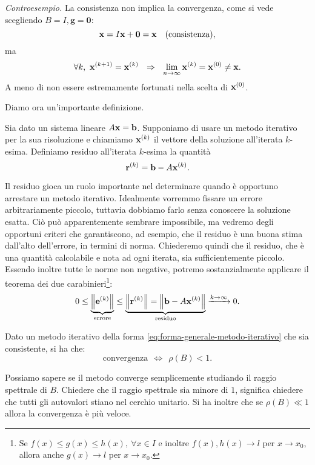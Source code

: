\textit{Controesempio.} La consistenza non implica la convergenza, come si vede scegliendo $B=I,\mathbf{g} =\mathbf{0}$:
\begin{equation*}
 \mathbf{x} =I\mathbf{x} +\mathbf{0} =\mathbf{x} \quad\text{(consistenza)},
\end{equation*}
ma
$$ \mathbf{\forall } k,\ \x^{( k+1)} =\x^{(k)} \ \ \Rightarrow \ \ \lim _{n\rightarrow \infty }\x^{(k)} = \x^{(0)} \neq \x. $$
A meno di non essere estremamente fortunati nella scelta di $\mathbf{x}^{(0)}$. \qedhere

Diamo ora un'importante definizione.
\begin{definition}
	[Residuo]
  Sia dato un sistema lineare $A\mathbf{x}=\mathbf{b}$. Supponiamo di usare un metodo iterativo per la sua risoluzione e chiamiamo $\mathbf{x}^{(k)}$ il vettore della soluzione all'iterata $k$-esima. Definiamo residuo all'iterata $k$-esima la quantità
	\begin{equation}
		 \mathbf{r}^{(k)} =\mathbf{b} -A\mathbf{x}^{(k)}.
	\end{equation}
\end{definition}
Il residuo gioca un ruolo importante nel determinare quando è opportuno arrestare un metodo iterativo.
Idealmente vorremmo fissare un errore arbitrariamente piccolo, tuttavia dobbiamo farlo senza conoscere la soluzione esatta.
Ciò può apparentemente sembrare impossibile, ma vedremo degli opportuni criteri che garantiscono, ad esempio, che il residuo è una buona stima dall'alto dell'errore, in termini di norma. Chiederemo quindi che il residuo, che è una quantità calcolabile e nota ad ogni iterata, sia sufficientemente piccolo. Essendo inoltre tutte le norme non negative, potremo sostanzialmente applicare il teorema dei due carabinieri\footnote{Se $f(x)\le g(x)\le h(x),\ \forall x\in I$ e inoltre $f(x),h(x)\to l$ per $x\to x_{0} $, allora anche $g(x)\to l$ per $x\to x_{0}$.}:
\begin{equation*}
0\leq \underbrace{\left\Vert \mathbf{e}^{(k)}\right\Vert }_{\text{errore}} \leq \underbrace{\left\Vert \mathbf{r}^{(k)}\right\Vert =\left\Vert\mathbf{b} -A\mathbf{x}^{(k)}\right\Vert}_{\text{residuo}}\xrightarrow{k\rightarrow \infty } 0.
\end{equation*}
\begin{theorem}
Dato un metodo iterativo della forma \eqref{eq:forma-generale-metodo-iterativo} che sia consistente, si ha che:
\begin{equation*}
\text{convergenza} \ \ \Leftrightarrow \ \ \rho (B) < 1.
\end{equation*}
\end{theorem}
Possiamo sapere se il metodo converge semplicemente studiando il raggio spettrale di $B$. Chiedere che il raggio spettrale sia minore di $1$, significa chiedere che tutti gli autovalori stiano nel cerchio unitario. Si ha inoltre che se $\rho (B) \ll 1$ allora la convergenza è più veloce.

